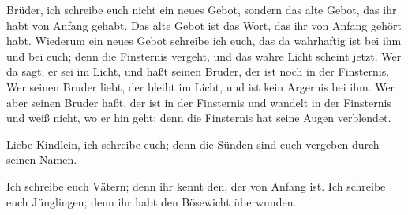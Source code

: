  Brüder, ich schreibe euch nicht ein neues Gebot, sondern
das alte Gebot, das ihr habt von Anfang gehabt. Das alte Gebot ist das
Wort, das ihr von Anfang gehört habt.  Wiederum ein neues
Gebot schreibe ich euch, das da wahrhaftig ist bei ihm und bei euch;
denn die Finsternis vergeht, und das wahre Licht scheint jetzt.
 Wer da sagt, er sei im Licht, und haßt seinen Bruder, der
ist noch in der Finsternis.  Wer seinen Bruder liebt, der
bleibt im Licht, und ist kein Ärgernis bei ihm.  Wer aber
seinen Bruder haßt, der ist in der Finsternis und wandelt in der
Finsternis und weiß nicht, wo er hin geht; denn die Finsternis hat seine
Augen verblendet.

 Liebe Kindlein, ich schreibe euch; denn die Sünden sind
euch vergeben durch seinen Namen.

 Ich schreibe euch Vätern; denn ihr kennt den, der von
Anfang ist. Ich schreibe euch Jünglingen; denn ihr habt den Bösewicht
überwunden.


